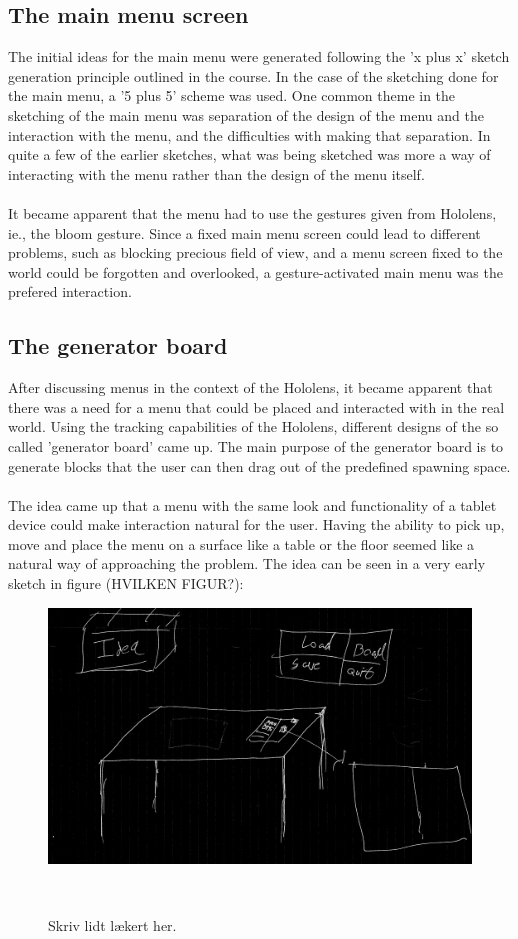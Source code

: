 \subsection{The main menu screen}
The initial ideas for the main menu were generated following the 'x plus x' sketch generation principle outlined in the course. In the case of the sketching done for the main menu, a '5 plus 5' scheme was used. One common theme in the sketching of the main menu was separation of the design of the menu and the interaction with the menu, and the difficulties with making that separation. In quite a few of the earlier sketches, what was being sketched was more a way of interacting with the menu rather than the design of the menu itself.\\
\\
It became apparent that the menu had to use the gestures given from Hololens, ie., the bloom gesture. Since a fixed main menu screen could lead to different problems, such as blocking precious field of view, and a menu screen fixed to the world could be forgotten and overlooked, a gesture-activated main menu was the prefered interaction.

\subsection{The generator board}
After discussing menus in the context of the Hololens, it became apparent that there was a need for a menu that could be placed and interacted with in the real world. Using the tracking capabilities of the Hololens, different designs of the so called 'generator board' came up. The main purpose of the generator board is to generate blocks that the user can then drag out of the predefined spawning space.\\
\\
The idea came up that a menu with the same look and functionality of a tablet device could make interaction natural for the user. Having the ability to pick up, move and place the menu on a surface like a table or the floor seemed like a natural way of approaching the problem. The idea can be seen in a very early sketch in figure (HVILKEN FIGUR?):\\

\begin{figure}
\centering
  \includegraphics[width=0.9\columnwidth]{figures/Generator/gen6.png}
  \caption{Skriv lidt lækert her. }~\label{fig:genboard}
\end{figure}

